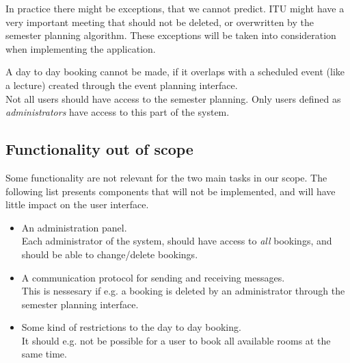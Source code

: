 In practice there might be exceptions, that we cannot predict. ITU might have a very important meeting that should not be deleted, or overwritten by the semester planning algorithm. These exceptions will be taken into consideration when implementing the application.

A day to day booking cannot be made, if it overlaps with a scheduled event (like a lecture) created through the event planning interface.\\

Not all users should have access to the semester planning. Only users defined as \emph{administrators} have access to this part of the system.

\subsection{Functionality out of scope}
Some functionality are not relevant for the two main tasks in our scope. The following list presents components that will not be implemented, and will have little impact on the user interface.

\begin{itemize}
	\item An administration panel.\\ Each administrator of the system, should have access to \emph{all} bookings, and should be able to change/delete bookings.
	\item A communication protocol for sending and receiving messages.\\ This is nessesary if e.g. a booking is deleted by an administrator through the semester planning interface.
	\item Some kind of restrictions to the day to day booking.\\ It should e.g. not be possible for a user to book all available rooms at the same time.
\end{itemize}